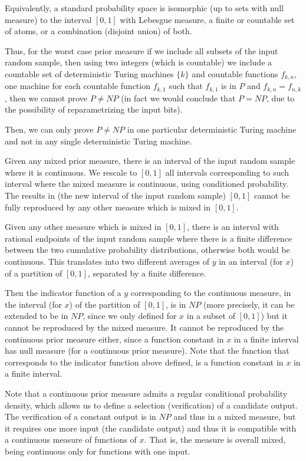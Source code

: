 \documentclass[11pt]{book}
\begin{document}
Equivalently, a standard probability space is isomorphic (up to sets
with null measure) to the interval \([0,1]\) with Lebesgue measure, a
finite or countable set of atoms, or a combination (disjoint union) of
both.

Thus, for the worst case prior measure if we include all subsets of the
input random sample, then using two integers (which is countable) we
include a countable set of deterministic Turing machines \(\{k\}\) and
countable functions \(f_{k,n}\), one machine for each countable function
\(f_{k,1}\) such that \(f_{k,1}\) is in \(P\) and \(f_{k,n}=f_{n,k}\),
then we cannot prove \(P\neq NP\) (in fact we would conclude that
\(P=NP\), due to the possibility of reparametrizing the input bits).

Then, we can only prove \(P\neq NP\) in one particular deterministic
Turing machine and not in any single deterministic Turing machine.

Given any mixed prior measure, there is an interval of the input random
sample where it is continuous. We rescale to \([0,1]\) all intervals
corresponding to such interval where the mixed measure is continuous,
using conditioned probability. The results in (the new interval of the
input random sample) \([0,1]\) cannot be fully reproduced by any other
measure which is mixed in \([0,1]\).

Given any other measure which is mixed in \([0,1]\), there is an
interval with rational endpoints of the input random sample where there
is a finite difference between the two cumulative probability
distributions, otherwise both would be continuous. This translates into
two different averages of \(y\) in an interval (for \(x\)) of a
partition of \([0,1]\), separated by a finite difference.

Then the indicator function of a \(y\) corresponding to the continuous
measure, in the interval (for \(x\)) of the partition of \([0,1]\), is
in \(NP\) (more precisely, it can be extended to be in \(NP\), since we
only defined for \(x\) in a subset of \([0,1]\)) but it cannot be
reproduced by the mixed measure. It cannot be reproduced by the
continuous prior measure either, since a function constant in \(x\) in a
finite interval has null measure (for a continuous prior measure). Note
that the function that corresponds to the indicator function above
defined, is a function constant in \(x\) in a finite interval.

Note that a continuous prior measure admits a regular conditional
probability density, which allows us to define a selection
(verification) of a candidate output. The verification of a constant
output is in \(NP\) and thus in a mixed measure, but it requires one
more input (the candidate output) and thus it is compatible with a
continuous measure of functions of \(x\). That is, the measure is
overall mixed, being continuous only for functions with one input.
\end{document}
